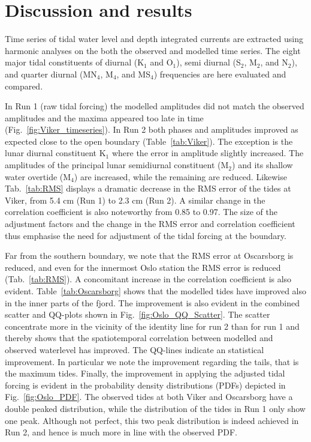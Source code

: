 \section{Discussion and results}
\label{sec:discuss}

Time series of tidal water level and depth integrated currents are extracted using harmonic analyses on the both the observed and modelled time series. The eight major tidal constituents of diurnal (K$_1$ and O$_1$), semi diurnal (S$_2$, M$_2$, and N$_2$), and quarter diurnal (MN$_4$, M$_4$, and MS$_4$) frequencies are here evaluated and compared. 

In Run 1 (raw tidal forcing) the modelled amplitudes did not match the observed amplitudes and the maxima appeared too late in time (Fig.~\ref{fig:Viker_timeseries}). In Run 2 both phases and amplitudes improved as expected close to the open boundary (Table~\ref{tab:Viker}). The exception is the lunar diurnal constituent K$_1$ where the error in amplitude slightly increased. The amplitudes of the principal lunar semidiurnal constituent (M$_2$) and its shallow water overtide (M$_4$) are increased, while the remaining are reduced. Likewise Tab.~\ref{tab:RMS} displays a dramatic decrease in the RMS error of the tides at Viker, from 5.4 cm (Run 1) to 2.3 cm (Run 2). A similar change in the correlation coefficient is also noteworthy from 0.85 to 0.97. The size of the adjustment factors and the change in the RMS error and correlation coefficient thus emphasise the need for adjustment of the tidal forcing at the boundary. 

Far from the southern boundary, we note that the RMS error at Oscarsborg is reduced, and even for the innermost Oslo station the RMS error is reduced (Tab.~\ref{tab:RMS}). A concomitant increase in the correlation coefficient is also evident. Table~\ref{tab:Oscarsborg} shows that the modelled tides have improved also in the inner parts of the fjord. 
The improvement is also evident in the combined scatter and QQ-plots shown in Fig.~\ref{fig:Oslo_QQ_Scatter}. The scatter concentrate more in the vicinity of the identity line for run 2 than for run 1 and thereby shows that the spatiotemporal correlation between modelled and observed waterlevel has improved. The QQ-lines indicate an statistical improvement. In particular we note the improvement regarding the tails, that is the maximum tides.
Finally, the improvement in applying the adjusted tidal forcing is evident in the probability density distributions (PDFs) depicted in Fig.~\ref{fig:Oslo_PDF}. The observed tides at both Viker and Oscarsborg have a double peaked distribution, while the distribution of the tides in Run 1 only show one peak. Although not perfect, this two peak distribution is indeed achieved in Run 2, and hence is much more in line with the observed PDF. 

